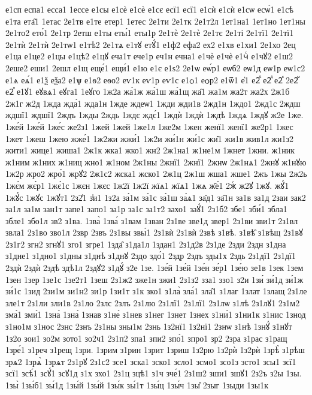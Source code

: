 {е1сп
еспа1
есса1
1ессе
е1сы
е1сѐ
е1сѐ
е1сє
есї1
есї1
е1сѝ
е1сѝ
е1сѡ
есѡ́1
е1сѣ
е1та
ета̑1
1етас
2е1тв
е1те
етер1
1етес
2е1ти
2е1тк
2е1т2л
1ет1на1
1ет1но
1ет1ны
2е1то2
ето́1
2е1тр
2етш
е1ты
еты́1
еты1р
2е1тѐ
2е1тѐ
2е1тє
2е1ті
2е1тї1
2е1тї1
2е1тѝ
2е1тѝ
2е1тѡ1
е1тѣ2
2е1тѧ
е1тꙋ
етꙋ́1
е1ф2
ефа2
ех2
е1хв
е1хи1
2е1хо
2ец
е1ца
е1це2
е1цы
е1цѣ2
е1цꙋ
еча1т
ече1р
еч1н
ечна1
е1чѐ
е1чѐ
е1чⷭ
е1чꙋ2
е1ш2
2еше2
еши1
2ешл
е1щ
еще́1
ещи́1
е1ю
е1є
е1ѕ2
2е1ѡ
еѡ́р1
еѡб2
еѡ1д
еѡ1р
еѡ1с2
е1ѧ
еѧ́1
е1ѯ
еѯа2
е1ѱ
е1ѳ2
еѳо2
еѵ1к
еѵ1р
еѵ1с
е1ѻ1
еѻр2
е1ѿ1
е҆1
е2ⷡ
е2ⷣ
е2ⷦ
2е2ⷨ
е2ⷫ
е1ꙋ1
еꙋвѧ1
еꙋга1
1еꙋго
1ж2а
жа́1ж
жа́1ш
жа́1щ
жа̑1
жа1м
жа2т
жа2х
2ж1б
2ж1г
ж2д
1жда
жда́1
жда1н
1жде
ждеѡ1
1жди
жди1в
2жд1н
1ждо1
2жд1с
2ждш
ждшї1
ждшї1
2ждъ
1жды
2ждь
1ждє
ждє́1
1ждѝ
1ждѝ
1ждѣ
1ждѧ
1ждꙋ
ж2е
1же.
1же́й
1же́й
1же́с
же2з1
1жей
1жей
1же1л
1же2м
1жен
женї1
женї1
же2р1
1жес
1жет
1жеш
1жею
жже́1
1ж2жи
жжи́1
1ж2и
жи́1н
жи́1с
жи̑1
жи1в
жив1л
жи1з2
жити1
жице1
жиша1
2ж1к
жка1
жко1
жн2
2ж1на1
ж1не1м
1жнет
1жни.
ж1ник
ж1ним
ж1них
ж1ниц
жно1
ж1ном
2ж1ны
2жнї1
2жнї1
2жнѡ
2ж1нѧ1
2жнꙋ
ж1нꙋю
1ж2р
жро2
жро́1
жрꙋ2
2ж1с2
жска1
жско1
2ж1ц
2ж1ш
жша1
жше1
2жъ
1жы
2ж2ь
1жє́м
жє́р1
1жє́1с
1жєн
1жєс
1ж2ї
1ж2ї
жїѧ1
жїѧ1
1жѧ
ж҃е́1
2жⷭ
ж2ꙋ
1жꙋ.
жꙋ́1
1жꙋ́с
1жꙋс
1жꙋт1
2з2̾1
з̾и1
1з2а
за́1м
за́1с
за́1ш
за́ѧ1
за̑д1
за̑1н
за1в
за1д
2заи
зак2
за1л
за1м
зан1т
запе1
запо1
за1р
за1с
за1т2
захо1
заꙋ́1
2з1б2
збе1
зби́1
збла1
збле1
збо1л
зв2
з1ва.
1зва̀
1зва́
з1вам
1зван
2з1ве
зве1д
звер1
2з1ви
зви1т
2з1вл
звла1
2з1во
зво1л
2звр
2звъ
2з1вы
звы́1
2з1вѝ
2з1вѝ
2звѣ
з1вѣ.
з1вѣ̑
з1вѣщ
2з1вꙋ
2з1г2
згн2
згнꙋ1
зго1
згре1
1зда̑
з1да1л
1здан1
2з1д2в
2з1де
2зди
2здн
з1дна
з1дне1
з1дно1
з1дны
з1днѣ
з1днꙋ
2здо
здо́1
2здр
2здъ
зды1х
2здь
2з1дї1
2з1дї1
2здѝ
2здѝ
2здѣ
здѣ1л
2здꙋ2
з1дꙋ́
з2е
1зе.
1зе́й
1зе́й
1зе́н
зе́р1
1зе́ю
зе1в
1зек
1зем
1зен
1зер
1зе1с
1зе2т1
1зеш
2з1ж2
зже1н
зжи1
2з1з2
зза1
ззо1
з2и
1зи́
зи́1д
зи́1ж
зи́1с
1зид
2зи1м
зи1н2
зи1р
1зи1т
з1к
зко1
з1ла̀
зла́1
зла̑1
з1лаг
1злат
1злащ
2з1ле
зле1т
2з1ли
зли1в
2з1ло
2злс
2злъ
2з1лю
2з1лї1
2з1лї1
2з1лѡ
з1лѣ
2з1лꙋ1
2з1м2
зма́1
зми́1
1зна̀
1зна́
1знав
з1не́
з1нев
з1нег
1знет
1знех
з1ни́1
з1ни1к
з1нис
1знод
з1но1м
з1нос
2знс
2знъ
2з1ны
зны1м
2знь
1з2нї1
1з2нї1
2знѡ
з1нѣ
1знꙋ́
з1нꙋт
1з2о
зои1
зо2м
зото1
зо2ч1
2з1п2
зпа1
зпи2
зпо́1
зпро1
зр2
2зра
з1рас
з1ращ
1зре́1
з1реч
з1рещ
1зри.
1зрим
з1рин
1зрит
1зриш
1з2рю
1з2рѝ
1з2рѝ
1зрѣ̀
з1рѣш
зрѧ2
1зрѧ̀
1зрѧт
2з1рꙋ
2з1с2
зсе1
зска1
зско1
зсло1
зсмо1
зсо1з
зсто1
зсы1
зсї1
зсї1
зсѣ́1
зсꙋ́1
зсꙋ1д
з1х
зхо1
2з1ц
зцѣ1
з1ч
зче́1
2з1ш2
зши1
зшꙋ1
2з2ъ
з2ы
1зы.
1зы̀
1зы́б1
зы́1д
1зы́й
1зы́й
1зы́к
зы́1т
1зы́ц
1зы́ч
1зы̑
2зыг
1зыди
1зы1к
}
